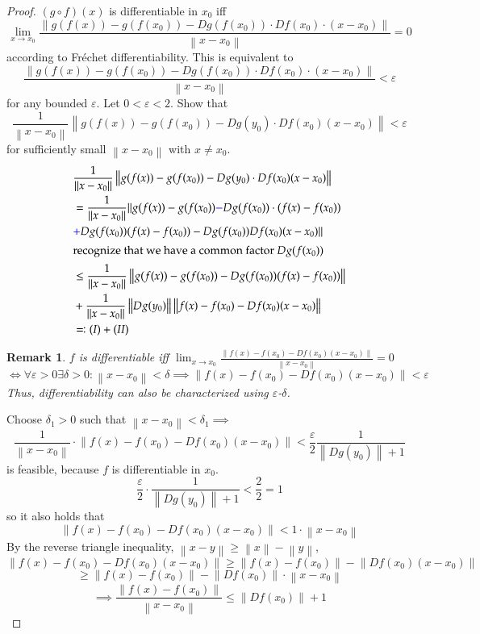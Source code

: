 \documentclass{article}
\newtheorem{remark}{Remark}  \numberwithin{remark}{section}
\newcommand{\norm}[1]{\left\|#1\right\|}
\begin{document}
\begin{proof}
  $(g \circ f)(x)$ is differentiable in $x_0$ iff
  \[ \lim_{x \to x_0} \frac{\norm{g(f(x)) - g(f(x_0)) - D g(f(x_0)) \cdot Df(x_0) \cdot (x - x_0)}}{\norm{x - x_0}} = 0 \]
  according to Fr\'echet differentiability. This is equivalent to 
  \[ \frac{\norm{g(f(x)) - g(f(x_0)) - D g(f(x_0)) \cdot Df(x_0) \cdot (x - x_0)}}{\norm{x - x_0}} < \varepsilon \]
  for any bounded $\varepsilon$.
  Let $0 < \varepsilon < 2$.
  Show that
  \[ \frac1{\norm{x - x_0}} \norm{g(f(x)) - g(f(x_0)) - Dg(y_0) \cdot Df(x_0) (x - x_0)} < \varepsilon \]
  for sufficiently small $\norm{x - x_0}$ with $x \neq x_0$.
  \begin{align*}
    &\frac1{\norm{x - x_0}} \norm{g(f(x)) - g(f(x_0)) - Dg(y_0) \cdot Df(x_0) (x - x_0)} \\
    &= \frac1{\norm{x - x_0}} \| g(f(x)) - g(f(x_0)) {\color{blue} -} Dg(f(x_0)) \cdot (f(x) - f(x_0)) \\
    &{\color{blue} +} Dg(f(x_0)) (f(x) - f(x_0)) - Dg(f(x_0)) Df(x_0) (x - x_0) \| \\
  \intertext{recognize that we have a common factor $Dg(f(x_0))$}
    &\leq \frac{1}{\norm{x - x_0}} \norm{g(f(x)) - g(f(x_0)) - Dg(f(x_0))(f(x) - f(x_0))} \\
    &+ \frac{1}{\norm{x - x_0}} \norm{Dg(y_0)} \norm{f(x) - f(x_0) - Df(x_0)(x - x_0)} \\
    &\eqqcolon (I) + (II)
  \end{align*}
  \begin{remark}
    $f$ is differentiable iff $\lim_{x \to x_0} \frac{\norm{f(x) - f(x_0) - Df(x_0)(x - x_0)}}{\norm{x - x_0}} = 0 $
    \[ \iff \forall \varepsilon > 0 \exists \delta > 0: \norm{x - x_0} < \delta \implies \norm{f(x) - f(x_0) - Df(x_0)(x - x_0)} < \varepsilon \]
    Thus, differentiability can also be characterized using $\varepsilon$-$\delta$.
  \end{remark}
  Choose $\delta_1 > 0$ such that $\norm{x - x_0} < \delta_1 \implies$
  \[ \frac{1}{\norm{x - x_0}} \cdot \norm{f(x) - f(x_0) - Df(x_0) (x - x_0)} < \frac{\varepsilon}2 \frac{1}{\norm{Dg(y_0)} + 1} \]
  is feasible, because $f$ is differentiable in $x_0$.
  \[ \frac{\varepsilon}{2} \cdot \frac{1}{\norm{Dg(y_0)} + 1} < \frac22 = 1 \]
  so it also holds that
  \[ \norm{f(x) - f(x_0) - Df(x_0) (x - x_0)} < 1 \cdot \norm{x - x_0} \]
  By the reverse triangle inequality, $\norm{x - y} \geq \norm{x} - \norm{y}$,
  \[ \norm{f(x) - f(x_0) - Df(x_0) (x - x_0)} \geq \norm{f(x) - f(x_0)} - \norm{Df(x_0) (x - x_0)} \]
  \[ \geq \norm{f(x) - f(x_0)} - \norm{Df(x_0)} \cdot \norm{x - x_0} \]
  \[ \implies \frac{\norm{f(x) - f(x_0)}}{\norm{x - x_0}} \leq \norm{Df(x_0)} + 1 \]


\end{proof}
\end{document}
